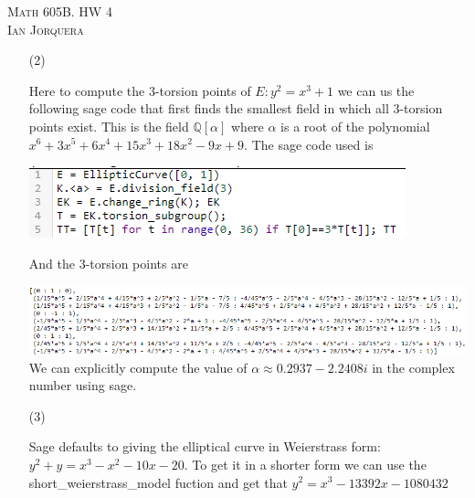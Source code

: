 \documentclass[12pt]{amsart}
\theoremstyle{definition}
\newcommand{\Q}{\mathbb{Q}}
\begin{document}
\begin{center}
    \textsc{Math 605B. HW 4\\ Ian Jorquera}
\end{center}
\vspace{1em}

\begin{itemize}
\item[(2)]

Here to compute the $3$-torsion points of $E:y^2=x^3+1$ we can us the following sage code that first finds the smallest field in which all $3$-torsion points exist. This is the field $\Q[\alpha]$ where $\alpha$ is a root of the polynomial $x^6 + 3x^5 + 6x^4 + 15x^3 + 18x^2 - 9x + 9$. The sage code used is 

\includegraphics[]{pics/hw4sage1ag.png}

And the $3$-torsion points are

\includegraphics[scale=.95]{pics/hw4sage2ag.png}\\

We can explicitly compute the value of $\alpha\approx 0.2937 - 2.2408i$ in the complex number using sage.


\item[(3)] 

Sage defaults to giving the elliptical curve in Weierstrass form: $y^2 + y = x^3 - x^2 - 10x - 20$. To get it in a shorter form we can use the short\_weierstrass\_model fuction and get that $y^2 = x^3 - 13392x - 1080432$ 


\end{itemize}
\end{document}
